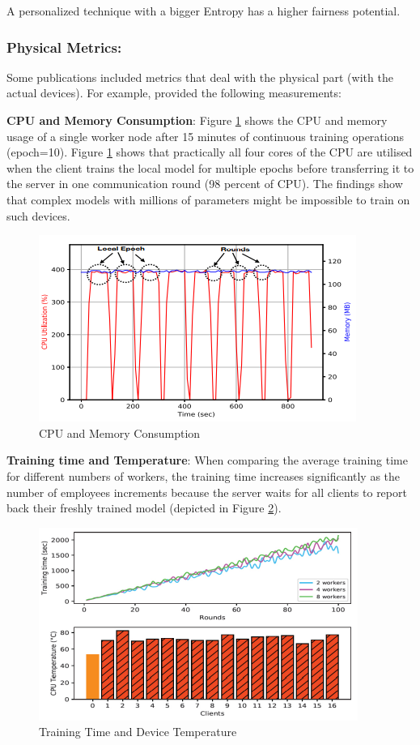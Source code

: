 A personalized technique with a bigger Entropy has a higher fairness potential.

\subsubsection{Physical Metrics:}

Some publications included metrics that deal with the physical part (with the actual devices). For example, \cite{fl24} provided the following measurements:

\textbf{CPU and Memory Consumption}: Figure \ref{fig:fl_CPU_memory} shows the CPU and memory usage of a single worker node after 15 minutes of continuous training operations (epoch=10). Figure \ref{fig:fl_CPU_memory} shows that practically all four cores of the CPU are utilised when the client trains the local model for multiple epochs before transferring it to the server in one communication round (98 percent of CPU). The findings show that complex models with millions of parameters might be impossible to train on such devices.

\begin{figure}[H]
\centering
\includegraphics[scale=0.9]{img/fl_CPU_memory.PNG}
\caption{CPU and Memory Consumption}
\label{fig:fl_CPU_memory}
\end{figure}


\textbf{Training time and Temperature}: When comparing the average training time for different numbers of workers, the training time increases significantly as the number of employees increments because the server waits for all clients to report back their freshly trained model (depicted in Figure \ref{fig:fl_time_temperature}).

\begin{figure}[H]
\centering
\includegraphics[scale=0.9]{img/fl_time_temperature.PNG}
\caption{Training Time and Device Temperature}
\label{fig:fl_time_temperature}
\end{figure}

